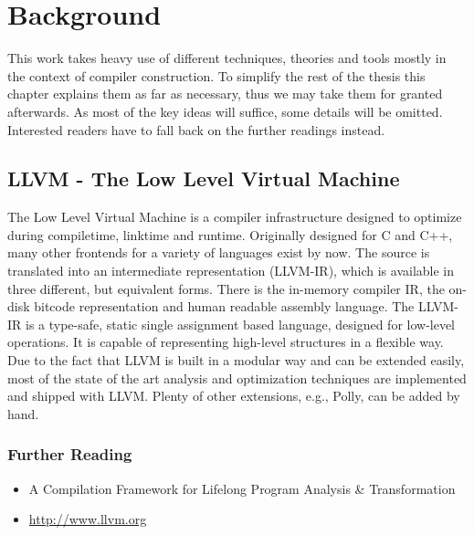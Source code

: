 
\chapter{Background} %
\label{Chapter2}

This work takes heavy use of different techniques, theories and tools mostly 
in the context of compiler construction. To simplify the rest of the thesis 
this chapter explains them as far as necessary, thus we may take
them for granted afterwards. As most of the key ideas will suffice, 
some details will be omitted. 
Interested readers have to fall back on the further readings instead. 


\section{LLVM - The Low Level Virtual Machine}
\label{LLVM}
The Low Level Virtual Machine is a compiler infrastructure designed to optimize
during compiletime, linktime and runtime. Originally designed for C and C++, 
many other frontends for a variety of languages exist by now. The source is 
translated into an intermediate representation (LLVM-IR), which is available 
in three different, but equivalent forms. There is the in-memory compiler IR, 
the on-disk bitcode representation and human readable assembly language.
The LLVM-IR is a type-safe, static single assignment based language,
designed for low-level operations. It is capable of 
representing high-level structures in a flexible way.
Due to the fact that LLVM is built in a modular 
way and can be extended easily, most of the state of the art analysis and
optimization techniques are implemented and shipped with LLVM. Plenty of other
extensions, e.g., Polly, can be added by hand. 


\subsection*{Further Reading}

\begin{itemize}
  \item A Compilation Framework for Lifelong Program Analysis \& Transformation
    \cite{LLVM:CGO04}  
  \item \url{http://www.llvm.org} \nocite{LLVM:Online}
\end{itemize}


